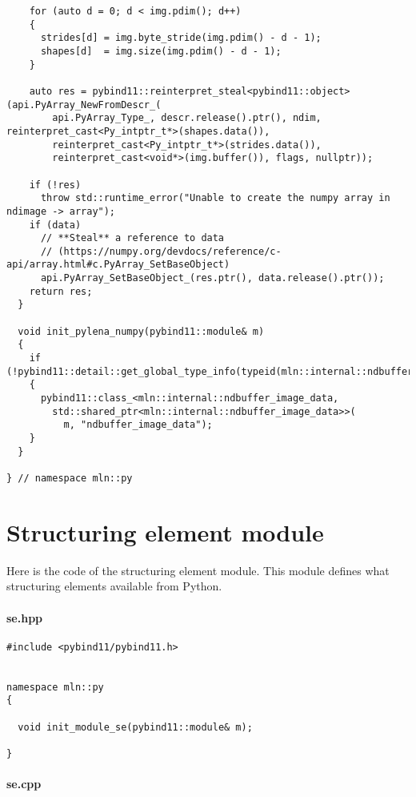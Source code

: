 \begin{verbatim}
    for (auto d = 0; d < img.pdim(); d++)
    {
      strides[d] = img.byte_stride(img.pdim() - d - 1);
      shapes[d]  = img.size(img.pdim() - d - 1);
    }

    auto res = pybind11::reinterpret_steal<pybind11::object>(api.PyArray_NewFromDescr_(
        api.PyArray_Type_, descr.release().ptr(), ndim, reinterpret_cast<Py_intptr_t*>(shapes.data()),
        reinterpret_cast<Py_intptr_t*>(strides.data()),
        reinterpret_cast<void*>(img.buffer()), flags, nullptr));

    if (!res)
      throw std::runtime_error("Unable to create the numpy array in ndimage -> array");
    if (data)
      // **Steal** a reference to data
      // (https://numpy.org/devdocs/reference/c-api/array.html#c.PyArray_SetBaseObject)
      api.PyArray_SetBaseObject_(res.ptr(), data.release().ptr());
    return res;
  }

  void init_pylena_numpy(pybind11::module& m)
  {
    if (!pybind11::detail::get_global_type_info(typeid(mln::internal::ndbuffer_image_data)))
    {
      pybind11::class_<mln::internal::ndbuffer_image_data,
        std::shared_ptr<mln::internal::ndbuffer_image_data>>(
          m, "ndbuffer_image_data");
    }
  }

} // namespace mln::py
\end{verbatim}


\clearpage

\section{Structuring element module}
\label{appendix:static-dynamic-bridge.se}

Here is the code of the structuring element module. This module defines what structuring elements available from Python.

\paragraph{se.hpp}
\label{appendix:static-dynamic-bridge.se.hpp}

\begin{verbatim}
#include <pybind11/pybind11.h>


namespace mln::py
{

  void init_module_se(pybind11::module& m);

}
\end{verbatim}

\paragraph{se.cpp}
\label{appendix:static-dynamic-bridge.se.cpp}

